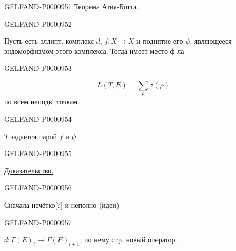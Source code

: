 \begin{GelfandAdjacentEvidence}{GELFAND-P000095}{1}
\underline{Теорема} Атия-Ботта.
\end{GelfandAdjacentEvidence}
\begin{GelfandAdjacentEvidence}{GELFAND-P000095}{2}

Пусть есть эллипт. комплекс $d$,
$f:X\to X$ и поднятие его $\psi$, являющееся эндоморфизмом
этого комплекса. Тогда имеет место ф-ла
\end{GelfandAdjacentEvidence}
\begin{GelfandAdjacentEvidence}{GELFAND-P000095}{3}

\begin{equation*}L(T,E)=\sum_\rho\sigma(\rho)\end{equation*}
по всем неподв. точкам.
\end{GelfandAdjacentEvidence}
\begin{GelfandAdjacentEvidence}{GELFAND-P000095}{4}

$T$ задаётся парой $f$ и $\psi$.
\end{GelfandAdjacentEvidence}
\begin{GelfandAdjacentEvidence}{GELFAND-P000095}{5}

\underline{Доказательство.}
\end{GelfandAdjacentEvidence}
\begin{GelfandAdjacentEvidence}{GELFAND-P000095}{6}

Сначала нечётко[?] и неполно (идеи)
\end{GelfandAdjacentEvidence}
\begin{GelfandAdjacentEvidence}{GELFAND-P000095}{7}

$d:\Gamma(E)_i\longrightarrow\Gamma(E)_{i+1}$, по нему стр. новый оператор.
\end{GelfandAdjacentEvidence}
